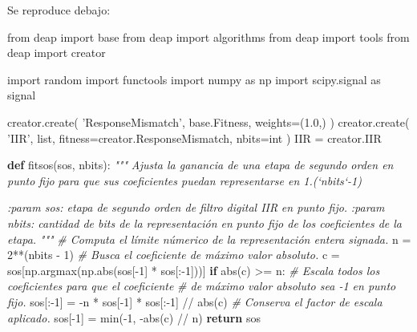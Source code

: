 \documentclass[11pt]{article}
\newenvironment{Shaded}{}{}
\newcommand{\KeywordTok}[1]{\textcolor[rgb]{0.00,0.44,0.13}{\textbf{{#1}}}}
\newcommand{\DecValTok}[1]{\textcolor[rgb]{0.25,0.63,0.44}{{#1}}}
\newcommand{\FloatTok}[1]{\textcolor[rgb]{0.25,0.63,0.44}{{#1}}}
\newcommand{\StringTok}[1]{\textcolor[rgb]{0.25,0.44,0.63}{{#1}}}
\newcommand{\CommentTok}[1]{\textcolor[rgb]{0.38,0.63,0.69}{\textit{{#1}}}}
\newcommand{\NormalTok}[1]{{#1}}
\newcommand{\ImportTok}[1]{{#1}}
\newcommand{\ControlFlowTok}[1]{\textcolor[rgb]{0.00,0.44,0.13}{\textbf{{#1}}}}
\newcommand{\OperatorTok}[1]{\textcolor[rgb]{0.40,0.40,0.40}{{#1}}}
\newcommand{\BuiltInTok}[1]{{#1}}
\begin{document}
Se reproduce debajo:

\hrulefill

    \begin{Shaded}
\begin{Highlighting}[]
\ImportTok{from}\NormalTok{ deap }\ImportTok{import}\NormalTok{ base}
\ImportTok{from}\NormalTok{ deap }\ImportTok{import}\NormalTok{ algorithms}
\ImportTok{from}\NormalTok{ deap }\ImportTok{import}\NormalTok{ tools}
\ImportTok{from}\NormalTok{ deap }\ImportTok{import}\NormalTok{ creator}

\ImportTok{import}\NormalTok{ random}
\ImportTok{import}\NormalTok{ functools}
\ImportTok{import}\NormalTok{ numpy }\ImportTok{as}\NormalTok{ np}
\ImportTok{import}\NormalTok{ scipy.signal }\ImportTok{as}\NormalTok{ signal}

\NormalTok{creator.create(}
    \StringTok{'ResponseMismatch'}\NormalTok{, base.Fitness, weights}\OperatorTok{=}\NormalTok{(}\FloatTok{1.0}\NormalTok{,)}
\NormalTok{)}
\NormalTok{creator.create(}
    \StringTok{'IIR'}\NormalTok{, }\BuiltInTok{list}\NormalTok{, fitness}\OperatorTok{=}\NormalTok{creator.ResponseMismatch, nbits}\OperatorTok{=}\BuiltInTok{int}
\NormalTok{)}
\NormalTok{IIR }\OperatorTok{=}\NormalTok{ creator.IIR}


\KeywordTok{def}\NormalTok{ fitsos(sos, nbits):}
    \CommentTok{"""}
\CommentTok{    Ajusta la ganancia de una etapa de segundo orden en punto fijo}
\CommentTok{    para que sus coeficientes puedan representarse en 1.(`nbits`-1)}

\CommentTok{    :param sos: etapa de segundo orden de filtro digital IIR}
\CommentTok{       en punto fijo.}
\CommentTok{    :param nbits: cantidad de bits de la representación en}
\CommentTok{       punto fijo de los coeficientes de la etapa.}
\CommentTok{    """}
    \CommentTok{# Computa el límite númerico de la representación entera signada.}
\NormalTok{    n }\OperatorTok{=} \DecValTok{2}\OperatorTok{**}\NormalTok{(nbits }\OperatorTok{-} \DecValTok{1}\NormalTok{)}
    \CommentTok{# Busca el coeficiente de máximo valor absoluto.}
\NormalTok{    c }\OperatorTok{=}\NormalTok{ sos[np.argmax(np.}\BuiltInTok{abs}\NormalTok{(sos[}\OperatorTok{-}\DecValTok{1}\NormalTok{] }\OperatorTok{*}\NormalTok{ sos[:}\OperatorTok{-}\DecValTok{1}\NormalTok{]))]}
    \ControlFlowTok{if} \BuiltInTok{abs}\NormalTok{(c) }\OperatorTok{>=}\NormalTok{ n:}
        \CommentTok{# Escala todos los coeficientes para que el coeficiente}
        \CommentTok{# de máximo valor absoluto sea -1 en punto fijo.}
\NormalTok{        sos[:}\OperatorTok{-}\DecValTok{1}\NormalTok{] }\OperatorTok{=} \OperatorTok{-}\NormalTok{n }\OperatorTok{*}\NormalTok{ sos[}\OperatorTok{-}\DecValTok{1}\NormalTok{] }\OperatorTok{*}\NormalTok{ sos[:}\OperatorTok{-}\DecValTok{1}\NormalTok{] }\OperatorTok{//} \BuiltInTok{abs}\NormalTok{(c)}
        \CommentTok{# Conserva el factor de escala aplicado.}
\NormalTok{        sos[}\OperatorTok{-}\DecValTok{1}\NormalTok{] }\OperatorTok{=} \BuiltInTok{min}\NormalTok{(}\OperatorTok{-}\DecValTok{1}\NormalTok{, }\OperatorTok{-}\BuiltInTok{abs}\NormalTok{(c) }\OperatorTok{//}\NormalTok{ n)}
    \ControlFlowTok{return}\NormalTok{ sos}



\end{Highlighting}
\end{Shaded}
\end{document}
